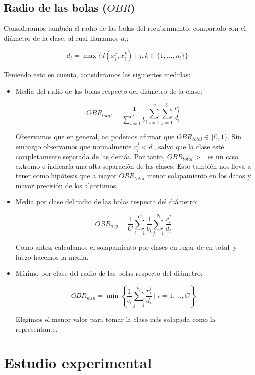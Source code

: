 \documentclass[a4paper,12pt]{report}
\theoremstyle{definition}
\begin{document}
\section{Radio de las bolas ($OBR$)}
\label{sec:obr}

Consideramos también el radio de las bolas del recubrimiento, comparado con el diámetro de la clase, al cual llamamos $d_i$:

$$ d_i = \max \lbrace d(x_i^j, x_i^k) \mid j,k \in \lbrace 1,\ldots,n_i \rbrace \rbrace$$

Teniendo esto en cuenta, consideramos las siguientes medidas:

\begin{itemize}
\item Media del radio de las bolas respecto del diámetro de la clase:

  $$ OBR_{total} = \frac{1}{\sum_{i=1}^C b_i}\sum_{i=1}^C \sum_{j=1}^{b_i} \frac{r_i^j}{d_i} $$

  Observamos que en general, no podemos afirmar que $OBR_{total} \in \rbrace 0, 1\rbrace$. Sin embargo observamos que normalmente $r_i^j < d_i$, salvo que la clase esté completamente separada de las demás. Por tanto, $OBR_{total} > 1$ es un caso extremo e indicaría una alta separación de las clases. Esto también nos lleva a tener como hipótesis que a mayor $OBR_{total}$ menor solapamiento en los datos y mayor precisión de los algoritmos.

\item Media por clase del radio de las bolas respecto del diámetro:

  $$ OBR_{avg} = \frac{1}{C}\sum_{i=1}^C \frac{1}{b_i} \sum_{j=1}^{b_i} \frac{r_i^j}{d_i} $$

  Como antes, calculamos el solapamiento por clases en lugar de en total, y luego hacemos la media.

\item Mínimo por clase del radio de las bolas respecto del diámetro:

  $$ OBR_{min} = \min \left\lbrace \frac{1}{b_i} \sum_{j=1}^{b_i} \frac{r_i^j}{d_i} \mid i=1, \ldots, C \right\rbrace$$

  Elegimos el menor valor para tomar la clase más solapada como la representante.

\end{itemize}

\chapter{Estudio experimental}
\label{chp:exp}
\end{document}
